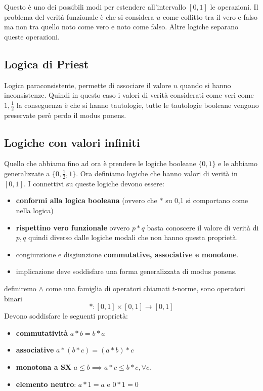 Questo è uno dei possibili modi per estendere all'intervallo $[0,1]$ le operazioni.
Il problema del verità funzionale è che si considera $u$ come coflitto tra il vero 
e falso ma non tra quello noto come vero e noto come falso. Altre logiche separano 
queste operazioni.  


\subsection{Logica di Priest}
Logica paraconsistente, permette di associare il valore $u$ quando si hanno inconsistenze.
Quindi in questo caso i valori di verità considerati come veri come $1,\frac{1}{2}$
la conseguenza è che si hanno tautologie, tutte le tautologie booleane vengono preservate 
però perdo il modus ponens.


\subsection{Logiche con valori infiniti}
Quello che abbiamo fino ad ora è prendere le logiche booleane $\{0,1\}$ e le abbiamo 
generalizzate a $\{0,\frac{1}{2},1\}$. Ora definiamo logiche che hanno valori di 
verità in $[0,1]$. I connettivi su queste logiche devono essere:
\begin{itemize}
    \item \textbf{conformi alla logica booleana} (ovvero che $\ast$ su 0,1 si comportano come nella logica)
    \item \textbf{rispettino vero funzionale} ovvero $p\ast q $ basta conoscere il valore di verità
    di $p,q$ quindi diverso dalle logiche modali che non hanno questa proprietà.
    \item congiunzione e disgiunzione \textbf{commutative, associative e monotone}.
    \item implicazione deve soddisfare una forma generalizzata di modus ponens.
\end{itemize}
\begin{definizione}
    definiremo $\land$ come una famiglia di operatori chiamati $t$-norme, sono operatori 
    binari 
    $$\ast : [0,1]\times [0,1]\to [0,1]$$
    Devono soddisfare le seguenti proprietà:
    \begin{itemize}
        \item \textbf{commutatività} $a\ast b = b\ast a$
        \item \textbf{associative} $a\ast (b\ast c) = (a\ast b)\ast c$
        \item \textbf{monotona a SX} $a\le b\implies a\ast c \le b\ast c,\forall c$.
        \item \textbf{elemento neutro}: $a\ast 1 = a$ e $0\ast 1 = 0$
    \end{itemize}        
\end{definizione}

